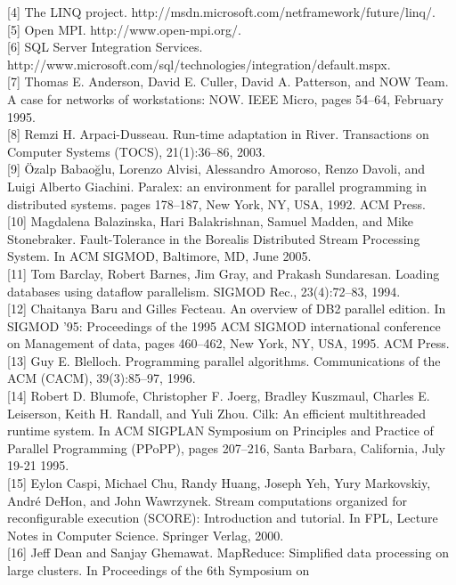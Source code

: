 \documentclass[
]{article}
\begin{document}
{[}4{]} The LINQ project.
http://msdn.microsoft.com/netframework/future/linq/.\\
{[}5{]} Open MPI. http://www.open-mpi.org/.\\
{[}6{]} SQL Server Integration Services.
http://www.microsoft.com/sql/technologies/integration/default.mspx.\\
{[}7{]} Thomas E. Anderson, David E. Culler, David A. Patterson, and NOW
Team. A case for networks of workstations: NOW. IEEE Micro, pages
54--64, February 1995.\\
{[}8{]} Remzi H. Arpaci-Dusseau. Run-time adaptation in River.
Transactions on Computer Systems (TOCS), 21(1):36--86, 2003.\\
{[}9{]} Özalp Babaoğlu, Lorenzo Alvisi, Alessandro Amoroso, Renzo
Davoli, and Luigi Alberto Giachini. Paralex: an environment for parallel
programming in distributed systems. pages 178--187, New York, NY, USA,
1992. ACM Press.\\
{[}10{]} Magdalena Balazinska, Hari Balakrishnan, Samuel Madden, and
Mike Stonebraker. Fault-Tolerance in the Borealis Distributed Stream
Processing System. In ACM SIGMOD, Baltimore, MD, June 2005.\\
{[}11{]} Tom Barclay, Robert Barnes, Jim Gray, and Prakash Sundaresan.
Loading databases using dataflow parallelism. SIGMOD Rec., 23(4):72--83,
1994.\\
{[}12{]} Chaitanya Baru and Gilles Fecteau. An overview of DB2 parallel
edition. In SIGMOD '95: Proceedings of the 1995 ACM SIGMOD international
conference on Management of data, pages 460--462, New York, NY, USA,
1995. ACM Press.\\
{[}13{]} Guy E. Blelloch. Programming parallel algorithms.
Communications of the ACM (CACM), 39(3):85--97, 1996.\\
{[}14{]} Robert D. Blumofe, Christopher F. Joerg, Bradley Kuszmaul,
Charles E. Leiserson, Keith H. Randall, and Yuli Zhou. Cilk: An
efficient multithreaded runtime system. In ACM SIGPLAN Symposium on
Principles and Practice of Parallel Programming (PPoPP), pages 207--216,
Santa Barbara, California, July 19-21 1995.\\
{[}15{]} Eylon Caspi, Michael Chu, Randy Huang, Joseph Yeh, Yury
Markovskiy, André DeHon, and John Wawrzynek. Stream computations
organized for reconfigurable execution (SCORE): Introduction and
tutorial. In FPL, Lecture Notes in Computer Science. Springer Verlag,
2000.\\
{[}16{]} Jeff Dean and Sanjay Ghemawat. MapReduce: Simplified data
processing on large clusters. In Proceedings of the 6th Symposium on
\end{document}
